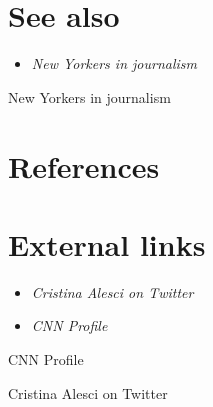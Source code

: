 \section{See also}\label{see-also}

\begin{itemize}
\item
  \emph{New Yorkers in journalism}
\end{itemize}

New Yorkers in journalism

\section{References}\label{references}

\section{External links}\label{external-links}

\begin{itemize}
\item
  \emph{Cristina Alesci on Twitter}
\item
  \emph{CNN Profile}
\end{itemize}

CNN Profile

Cristina Alesci on Twitter
